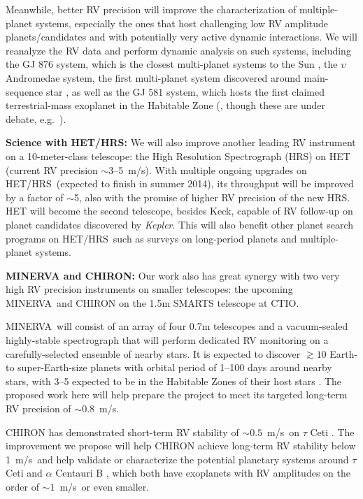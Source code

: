 \documentclass[12pt]{article}
\def\mps{m/s}
\def\kepler{{\it Kepler}}
\def\minerva{MINERVA}
\def\hrs{HET/HRS}
\begin{document}
Meanwhile, better RV precision will improve the characterization of
multiple-planet systems, especially the ones that host challenging low
RV amplitude planets/candidates and with potentially very active
dynamic interactions. We will reanalyze the RV data and perform
dynamic analysis on such systems, including the GJ 876 system, which
is the closest multi-planet systems to the Sun
\citep{marcy2001,rivera2005,rivera2010}, the $\upsilon$ Andromedae
system, the first multi-planet system discovered around main-sequence
star \citep{butler1999,wright2009,curiel2011}, as well as the GJ 581
system, which hosts the first claimed terrestrial-mass exoplanet in
the Habitable Zone (\citealt{vogt2010}, though these are under debate,
e.g.~\citealt{gregory2011,vogt2012,robertson2013}).

\textbf{Science with \hrs: } We will also improve another leading RV
instrument on a 10-meter-class telescope: the High Resolution
Spectrograph (HRS) on HET (current RV precision $\sim$3--5~\mps). With
multiple ongoing upgrades on \hrs\ (expected to finish in summer
2014), its throughput will be improved by a factor of $\sim$5, also
with the promise of higher RV precision of the new HRS. HET will
become the second telescope, besides Keck, capable of RV follow-up on
planet candidates discovered by \kepler. This will also benefit other
planet search programs on \hrs\ such as surveys on long-period planets
and multiple-planet systems.

\textbf{MINERVA and CHIRON: } Our work also has great synergy with two
very high RV precision instruments on smaller telescopes: the upcoming
\minerva\ and CHIRON on the 1.5m SMARTS telescope at CTIO. 

\minerva\ will consist of an array of four 0.7m telescopes and a
vacuum-sealed highly-stable spectrograph that will perform dedicated
RV monitoring on a carefully-selected ensemble of nearby stars. It is
expected to discover $\gtrsim 10$ Earth- to super-Earth-size planets
with orbital period of 1--100 days around nearby stars, with 3--5
expected to be in the Habitable Zones of their host stars
\citep{bottom2013,hogstrom2013}. The proposed work here will help
prepare the project to meet its targeted long-term RV precision of
$\sim 0.8$~\mps.

CHIRON has demonstrated short-term RV stability of $\sim0.5$~\mps\ on
$\tau$ Ceti \citep{chiron2013}. The improvement we propose will help
CHIRON achieve long-term RV stability below 1~\mps\ and help validate
or characterize the potential planetary systems around $\tau$ Ceti
\citep{tuomi2013} and $\alpha$ Centauri B
\citep{dumusque2012,hatzes2013}, which both have exoplanets with RV
amplitudes on the order of $\sim 1$~\mps\ or even smaller.
\end{document}

